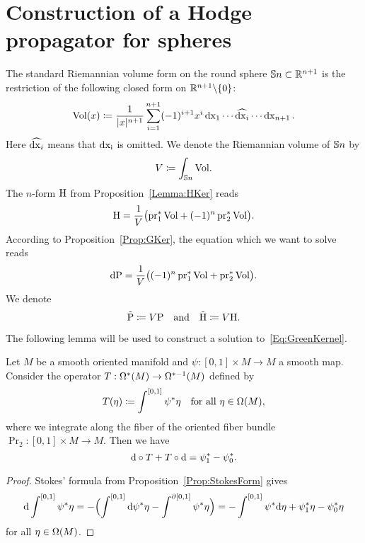 \documentclass[\MainFolder/Text.tex]{subfiles}
\begin{document}
\section{Construction of a Hodge propagator for spheres}
\allowdisplaybreaks
\label{Sec:GreenSphere}

The standard Riemannian volume form on the round sphere $\mathbb{S}{n}\subset \mathbb{R}^{n+1}$ is the restriction of the following closed form on $\mathbb{R}^{n+1}\backslash \{0\}$:  
\[ \mathrm{Vol}(x) \coloneqq \frac{1}{|x|^{n+1}}\sum_{i=1}^{n+1} (-1)^{i+1} x^i \operatorname{dx}_1 \dotsm \widehat{\operatorname{dx}_i} \dotsm \operatorname{dx}_{n+1}. \]
Here $\widehat{\operatorname{dx}_i}$ means that $\operatorname{dx_i}$ is omitted.
We denote the Riemannian volume of $\mathbb{S}{n}$ by
\[ V\coloneqq \int_{\mathbb{S}{n}} \mathrm{Vol}. \]
The $n$-form $\mathrm{H}$ from Proposition~\ref{Lemma:HKer} reads
\begin{equation*}
\mathrm{H} =  \frac{1}{V}\bigl(\operatorname{\mathrm{pr}}_1^*\mathrm{Vol} +  (-1)^{n} \operatorname{\mathrm{pr}}_2^*\mathrm{Vol}\bigr).
\end{equation*}
According to Proposition~\ref{Prop:GKer}, the equation which we want to solve reads
\begin{equation} \label{Eq:GreenKernel}
\mathrm{d} \mathrm{P} = \frac{1}{V}\bigl((-1)^{n}\operatorname{\mathrm{pr}}_1^*\mathrm{Vol} +  \operatorname{\mathrm{pr}}_2^*\mathrm{Vol}\bigr).
\end{equation}
We denote 
\[\tilde{\mathrm{P}}\coloneqq V\mathrm{P}\quad\text{and}\quad \tilde{\mathrm{H}}\coloneqq V\mathrm{H}.\]

The following lemma will be used to construct a solution to~\eqref{Eq:GreenKernel}. 
\begin{Lem}\label{Lem:ChainHtpy}
Let $M$ be a smooth oriented manifold and $\psi: [0,1]\times M \rightarrow M$ a smooth map. Consider the operator $T: \Omega^*(M) \rightarrow \Omega^{*-1}(M)$ defined by
\[ T(\eta) \coloneqq \int^{[0,1]} \psi^*\eta\quad\text{for all }\eta\in \Omega(M), \]
where we integrate along the fiber of the oriented fiber bundle $\Pr_2: [0,1]\times M \rightarrow M$. Then we have
\[ \mathrm{d}\circ T + T\circ \mathrm{d} = \psi_1^* - \psi_0^*. \]
\end{Lem}
%
\begin{proof}
Stokes' formula from Proposition~\ref{Prop:StokesForm} gives
\[ \mathrm{d} \int^{[0,1]}\psi^*\eta = -\Bigl( \int^{[0,1]} \mathrm{d} \psi^* \eta - \int^{\partial [0,1]} \psi^* \eta \Bigr) = - \int^{[0,1]} \psi^* \mathrm{d} \eta + \psi^*_1 \eta - \psi^*_0 \eta\]
for all $\eta \in \Omega(M)$.
\end{proof}
\end{document}
